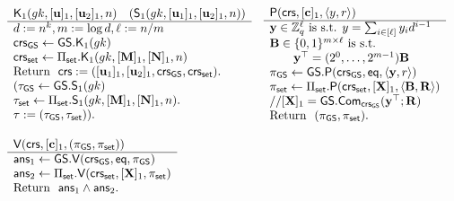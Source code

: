 \begin{figure} 
\begin{\algSize}
$$
\begin{array}{ll}
\begin{array}{l}
\algK_1(\gk,[\vecb{u}]_1,[\vecb{u}_2]_1,n)\quad (\mathsf{S}_1(\gk,[\vecb{u}_1]_1,[\vecb{u}_2]_1,n))\\
\hline
d:=n^k, m:=\log d, \ell := n/m\\
\crs_\GS\gets\GS.\algK_1(\gk)\\
{\crs_\sfset\gets\Pi_\sfset.\algK_1(\gk,[\matr{M}]_1,[\matr{N}]_1,n)}\\
\text{Return } \ \crs:=([\vecb{u}_1]_1,[\vecb{u}_2]_1,\crs_\GS,\crs_\sfset).\\
(\tau_\GS\gets\GS.\algS_1(\gk)\\
\tau_\sfset\gets\Pi_\sfset.\algS_1(\gk,[\matr{M}]_1,[\matr{N}]_1,n).\\
\tau := (\tau_\GS,\tau_\sfset)).\\
\\
\end{array}
&
\begin{array}{l}
{\algP(\crs, [\matr{c}]_1, \langle y, r\rangle)}\\
\hline
\vecb{y}\in\Z_q^{\ell} \text{ is s.t. } y=\sum_{i\in[\ell]}{y}_id^{i-1}\\
\matr{B}\in\bits^{m\times\ell} \text{ is s.t. }\\
\qquad\vecb{y}^\top = (2^0,\ldots,2^{m-1})\matr{B}\\
\pi_\GS\gets\GS.\algP(\crs_\GS,\eq,\langle \vecb{y},r\rangle)\\
\pi_\sfset \gets \Pi_\sfset.\algP(\crs_\sfset, [\matr{X}]_1,\langle\matr{B},\matr{R}\rangle)\\
//{[\matr{X}]_1} = \GS.\Com_{\crs_\GS}(\vecb{y}^\top;\matr{R})\\
\text{Return } \  (\pi_\GS,\pi_\sfset). \\
\\
\end{array}\\
\begin{array}{l}
{\algV(\crs,[\vecb{c}]_1,(\pi_\GS,\pi_\sfset))}\\
\hline
\mathsf{ans}_1 \gets \GS.\algV(\crs_\GS,\eq,\pi_\GS)\\
\mathsf{ans}_2 \gets \Pi_\sfset.\algV(\crs_\sfset,[\matr{X}]_1,\pi_\sfset)\\
\text{Return } \ \mathsf{ans}_1\wedge\mathsf{ans}_2.
\\
\\

\end{array}
\end{array}$$
\end{\algSize}
\end{figure}
